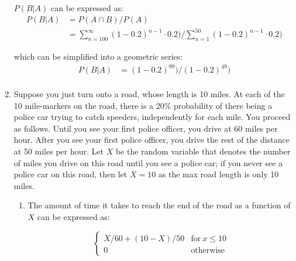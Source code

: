 \documentclass{article}
\begin{document}
\begin{enumerate}
    $P(B|A)$ can be expressed as:
        \begin{equation}
        \begin{split}
        P(B|A) &= P(A \cap B) / P(A)\\
        &= \sum_{n=100}^{\infty} (1 - 0.2)^{n-1} \cdot 0.2) / \sum_{n=1}^{50} (1 - 0.2)^{n-1} \cdot 0.2)
        \end{split}
        \end{equation}
        
    which can be simplified into a geometric series:
        \begin{equation}
        \begin{split}
            P(B|A) &= (1 - 0.2)^{99}) / (1 - 0.2)^{49})\\
        \end{split}
        \end{equation}

    \item Suppose you just turn onto a road, whose length is 10 miles. At each of the 10 mile-markers on the road, there is a 20\% probability of there being a police car trying to catch speeders, independently for each mile. You proceed as follows. Until you see your first police officer, you drive at 60 miles per hour. After you see your first police officer, you drive the rest of the distance at 50 miles per hour. Let $X$ be the random variable that denotes the number of miles you drive on this road until you see a police car; if you never see a police car on this road, then let $X = 10$ as the max road length is only 10 miles.
    
    \begin{enumerate}
        \item The amount of time it takes to reach the end of the road as a function of $X$ can be expressed as:

        \begin{equation}
            \begin{cases}
            X/60 + (10-X)/50 &\text{for}\ x \leq 10\\
            0 &\text{otherwise}
            \end{cases}
        \end{equation}\\
        


\end{enumerate}
\end{enumerate}
\end{document}
